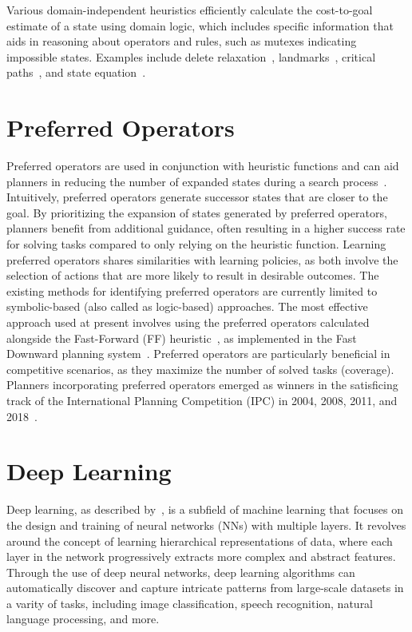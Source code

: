 \documentclass[ppgc,diss,english]{iiufrgs}
\begin{document}
Various domain-independent heuristics efficiently calculate the cost-to-goal estimate of a state using domain logic, which includes specific information that aids in reasoning about operators and rules, such as mutexes indicating impossible states. Examples include delete relaxation~\cite{Hoffmann.Nebel/2001}, landmarks~\cite{hoffmann-et-al-jair2004,Karpas.Domshlak/2009}, critical paths~\cite{haslum-geffner-aips2000}, and state equation~\cite{bonet-ijcai2013}.

\section{Preferred Operators}
Preferred operators are used in conjunction with heuristic functions and can aid planners in reducing the number of expanded states during a search process~\cite{Helmert/2006,Richter.Helmert/2009}. Intuitively, preferred operators generate successor states that are closer to the goal. By prioritizing the expansion of states generated by preferred operators, planners benefit from additional guidance, often resulting in a higher success rate for solving tasks compared to only relying on the heuristic function. Learning preferred operators shares similarities with learning policies, as both involve the selection of actions that are more likely to result in desirable outcomes. The existing methods for identifying preferred operators are currently limited to symbolic-based (also called as logic-based) approaches. The most effective approach used at present involves using the preferred operators calculated alongside the Fast-Forward (FF) heuristic~\cite{Hoffmann.Nebel/2001}, as implemented in the Fast Downward planning system~\cite{Helmert/2006}. Preferred operators are particularly beneficial in competitive scenarios, as they maximize the number of solved tasks (coverage). Planners incorporating preferred operators emerged as winners in the satisficing track of the International Planning Competition (IPC) in 2004, 2008, 2011, and 2018~\cite{Helmert/2006,Richter.lama.etal/2011,Richter.lama.etal/2011,Seipp-fast.etal/2018}.

\section{Deep Learning}
Deep learning, as described by~\citet{Goodfellow.etal/2016}, is a subfield of machine learning that focuses on the design and training of neural networks (NNs) with multiple layers. It revolves around the concept of learning hierarchical representations of data, where each layer in the network progressively extracts more complex and abstract features. Through the use of deep neural networks, deep learning algorithms can automatically discover and capture intricate patterns from large-scale datasets in a varity of tasks, including image classification, speech recognition, natural language processing, and more.
\end{document}
